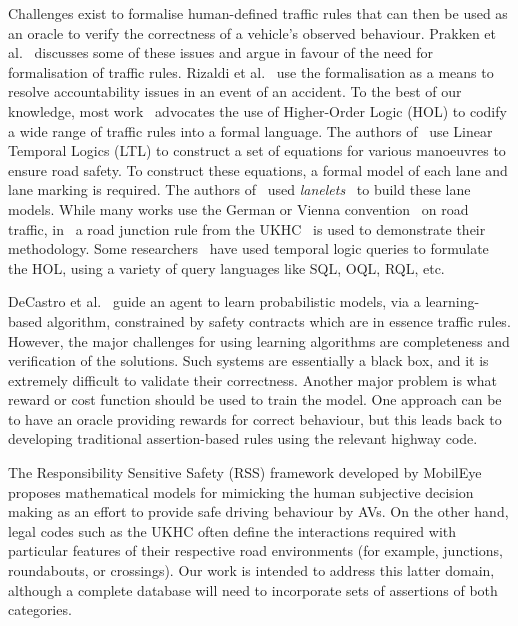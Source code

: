 
Challenges exist to formalise human-defined traffic rules that can then be used as an oracle to verify the correctness of a vehicle's observed behaviour. 
%
Prakken et al.~\cite{lawabidingstudy} discusses some of these issues and argue in favour of the need for formalisation of traffic rules. Rizaldi et al.~\cite{acountability} use the formalisation as a means to resolve accountability issues in an event of an accident. To the best of our knowledge, most work~\cite{acountability, esterle, rizaldi, alves} advocates the use of Higher-Order Logic (HOL) to codify a wide range of traffic rules into a formal language. The authors of~\cite{acountability, esterle, rizaldi, alves} use Linear Temporal Logics (LTL) to construct a set of equations for various manoeuvres to ensure road safety. To construct these equations, a formal model of each lane and lane marking is required. The authors of~\cite{rizaldi} used \textit{lanelets}~\cite{lanelets2014} to build these lane models. While many works use the German or Vienna convention~\cite{vienna} on road traffic, in~\cite{alves} a road junction rule from the UKHC~\cite{highwayCode} is used to demonstrate their methodology. Some researchers~\cite{sqlhuang, sqlgueffaz} have used temporal logic queries to formulate the HOL, using a variety of query languages like SQL, OQL, RQL, etc.  

DeCastro et al.~\cite{decastro2018counterexample} guide an agent to learn probabilistic models, via a learning-based algorithm, constrained by safety contracts which are in essence traffic rules. However, the major challenges for using learning algorithms are completeness and verification of the solutions. Such systems are essentially a black box, and it is extremely difficult to validate their correctness. Another major problem is what reward or cost function should be used to train the model. One approach can be to have an oracle providing rewards for correct behaviour, but this leads back to developing traditional assertion-based rules using the relevant highway code.

The Responsibility Sensitive Safety (RSS) framework developed by MobilEye~\cite{RSS_Shalev_Shwartz2017, RSS2_Koopman2019} proposes mathematical models for mimicking the human subjective decision making as an effort to provide safe driving behaviour by AVs. On the other hand, legal codes such as the UKHC often define the interactions required with particular features of their respective road environments (for example, junctions, roundabouts, or crossings). Our work is intended to address this latter domain, although a complete database will need to incorporate sets of assertions of both categories. 


